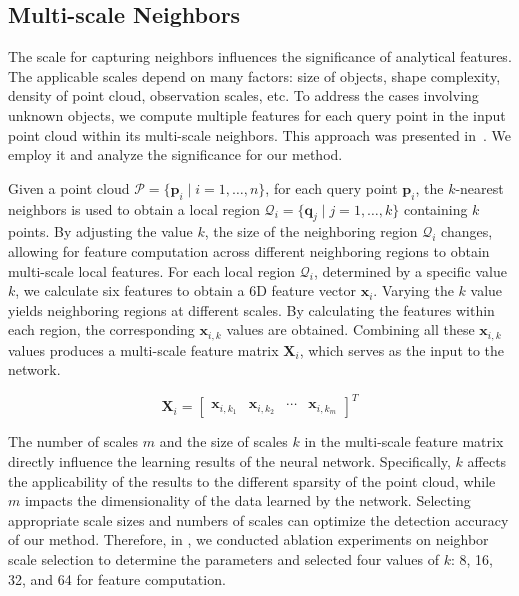 \documentclass[lettersize,journal]{IEEEtran}
\begin{document}
\subsection{Multi-scale Neighbors}
\label{sec:multi_scale}
The scale for capturing neighbors influences the significance of analytical features. The applicable scales depend on many factors: size of objects, shape complexity, density of point cloud, observation scales, etc. To address the cases involving unknown objects, we compute multiple features for each query point in the input point cloud within its multi-scale neighbors. 
This approach was presented in~\cite{himeur_pcednet_2022}. We employ it and analyze the significance for our method.

Given a point cloud $\mathcal{P} = \{\mathbf{p}_i \mid i = 1, \dots, n\}$, for each query point $\mathbf{p}_i$, the $k$-nearest neighbors is used to obtain a local region $\mathcal{Q}_i = \{\mathbf{q}_j \mid j = 1, \dots, k\}$ containing $k$ points. By adjusting the value \( k \), the size of the neighboring region $\mathcal{Q}_i$ changes, allowing for feature computation across different neighboring regions to obtain multi-scale local features. For each local region \( \mathcal{Q}_i \), determined by a specific value \( k \), we calculate six features to obtain a 6D feature vector  \( \mathbf{x}_i \). 
Varying the \( k \) value yields neighboring regions at different scales. By calculating the features within each region, the corresponding \( \mathbf{x}_{i,k} \) values are obtained. Combining all these \( \mathbf{x}_{i,k} \) values produces a multi-scale feature matrix \( \mathbf{X}_i \), which serves as the input to the network.

\begin{equation}
    \mathbf{X}_i = \begin{bmatrix} 
\mathbf{x}_{i,k_1} & \mathbf{x}_{i,k_2} & \cdots & \mathbf{x}_{i,k_m} \end{bmatrix}^T
\end{equation}

The number of scales $m$ and the size of scales $k$ in the multi-scale feature matrix directly influence the learning results of the neural network. Specifically, $k$ affects the applicability of the results to the different sparsity of the point cloud, while $m$ impacts the dimensionality of the data learned by the network. Selecting appropriate scale sizes and numbers of scales can optimize the detection accuracy of our method. Therefore, in , we conducted ablation experiments on neighbor scale selection to determine the parameters and selected four values of \( k \): 8, 16, 32, and 64 for feature computation.
\end{document}
